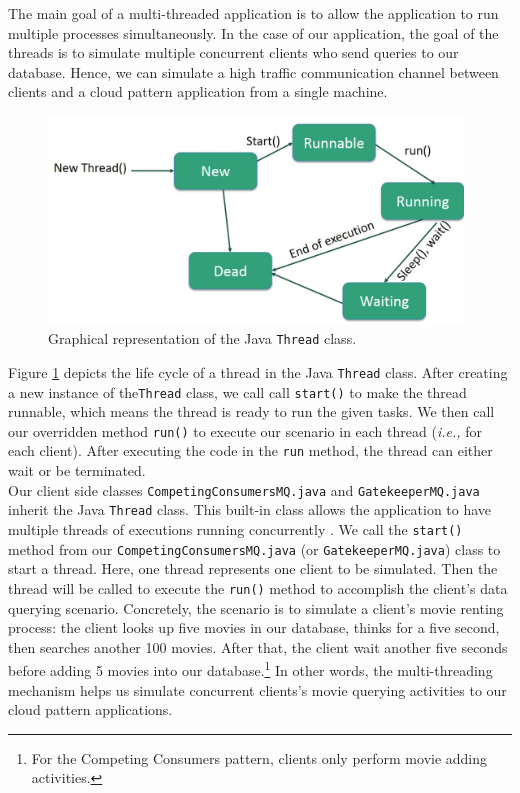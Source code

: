 \documentclass{article}
\begin{document}
The main goal of a multi-threaded application is to allow the application to run multiple processes simultaneously.  In the case of our application, the goal of the threads is to simulate multiple concurrent clients who send queries to our database. Hence, we can simulate a high traffic communication channel between clients and a cloud pattern application from a single machine. \\


\begin{figure}[t]
	\centering
	\includegraphics[width = 11cm]{images/threadSchema.jpg}
	\caption{Graphical representation of the Java \texttt{Thread} class.}
	\label{fig:Thread Schema}
\end{figure}


Figure \ref{fig:Thread Schema} depicts the life cycle of a thread in the Java \texttt{Thread} class. After creating a new instance of the\texttt{Thread} class, we call call \texttt{start()} to make the thread runnable, which means the thread is ready to run the given tasks. We then call our overridden method \texttt{run()} to execute our scenario in each thread (\emph{i.e.,} for each client). After executing the code in the \texttt{run} method, the thread can either wait or be terminated.  \\ 

Our client side classes \texttt{CompetingConsumersMQ.java} and  \texttt{GatekeeperMQ.java} inherit the Java \texttt{Thread} class. This built-in class allows the application to have multiple threads of executions running concurrently \cite{threads_java}. We call the \texttt{start()} method from our \texttt{CompetingConsumersMQ.java} (or \texttt{GatekeeperMQ.java}) class to start a thread. Here, one thread represents one client to be simulated. Then the thread will be called to execute the \texttt{run()} method to accomplish the client's data querying scenario. Concretely, the scenario is to simulate a client's movie renting process: the client looks up five movies in our database, thinks for a five second, then searches another 100 movies. After that, the client wait another five seconds before adding 5 movies into our database.\footnote{For the Competing Consumers pattern, clients only perform movie adding activities.} In other words, the multi-threading mechanism helps us simulate concurrent clients's movie querying activities to our cloud pattern applications.
\end{document}
